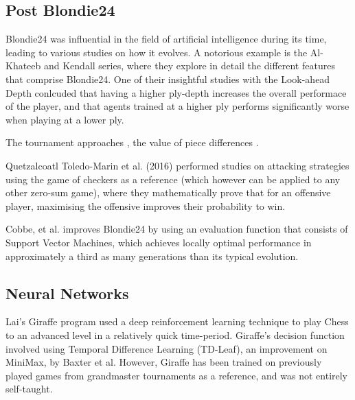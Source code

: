 \documentclass[12pt,a4paper]{article}
\begin{document}
        \subsection{Post Blondie24}

        Blondie24 was influential in the field of artificial intelligence during its time, leading to various studies on how it evolves. A notorious example is the Al-Khateeb and Kendall series, where they explore in detail the different features that comprise Blondie24. One of their insightful studies with the Look-ahead Depth \cite{al-khateeb_effect_2012} conlcuded that having a higher ply-depth increases the overall performace of the player, and that agents trained at a higher ply performs significantly worse when playing at a lower ply.
        
        The tournament approaches \cite{al-khateeb_introducing_2009}, the value of piece differences \cite{al-khateeb_importance_2010}. 
        
        Quetzalcoatl Toledo-Marin et al. (2016) performed studies on attacking strategies using the game of checkers as a reference (which however can be applied to any other zero-sum game), where they mathematically prove that for an offensive player, maximising the offensive improves their probability to win.\cite{toledo-marin_is_2016}

        Cobbe, et al. improves Blondie24 by using an evaluation function that consists of Support Vector Machines, which achieves locally optimal performance in approximately a third as many generations than its typical evolution. \cite{cobbe_accelerating_nodate} 
        
    \subsection{Neural Networks}
        Lai's Giraffe \cite{lai_giraffe:_2015} program used a deep reinforcement learning technique to play Chess to an advanced level in a relatively quick time-period. Giraffe's decision function involved using Temporal Difference Learning (TD-Leaf), an improvement on MiniMax, by Baxter et al. \cite{baxter_tdleaflambda_1999} However, Giraffe has been trained on previously played games from grandmaster tournaments as a reference, and was not entirely self-taught.
\end{document}
